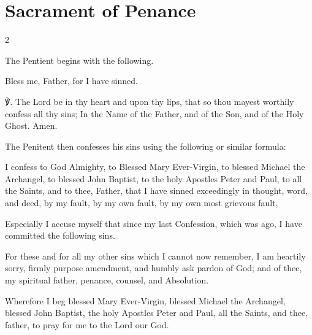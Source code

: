 \section{Sacrament of Penance}

\begin{multicols}{2}
\begin{rubric}
	The Pentient begins with the following.
\end{rubric}
Bless me, Father, for I have sinned.\par

℣. The Lord be in thy heart and upon thy lips, that so thou mayest worthily confess all thy sins; In the Name of the Father, {} and of the Son, and of the Holy Ghost. Amen.\par
\begin{rubric}
	{The Penitent then confesses his sins using the following or similar formula:}
\end{rubric}
\label{Confiteor}
I confess to God Almighty, to Blessed Mary Ever-Virgin, to blessed Michael the Archangel, to blessed John Baptist, to the holy Apostles Peter and Paul, to all the Saints, and to thee, Father, that I have sinned exceedingly in thought, word, and deed, by my fault, by my own fault, by my own most grievous fault,\par
Especially I accuse myself that since my last Confession, which was  ago, I have committed the following sins. \par
For these and for all my other sins which I cannot now remember, I am heartily sorry, firmly purpose amendment, and humbly ask pardon of God; and of thee, my spiritual father, penance, counsel, and Absolution.\par
Wherefore I beg blessed Mary Ever-Virgin, blessed Michael the Archangel, blessed John Baptist, the holy Apostles Peter and Paul, all the Saints, and thee, father, to pray for me to the Lord our God.

\newcolumn


\end{multicols}
